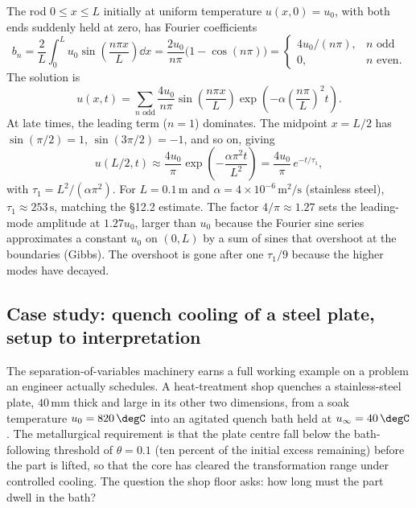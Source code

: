 The rod $0 \leq x \leq L$ initially at uniform temperature
$u(x, 0) = u_{0}$, with both ends suddenly held at zero, has
Fourier coefficients
\[
b_{n} = \frac{2}{L}\int_{0}^{L} u_{0} \sin\!\left(\frac{n \pi x}{L}\right) \dd x = \frac{2 u_{0}}{n \pi}\bigl(1 - \cos(n \pi)\bigr) = \begin{cases} 4 u_{0}/(n \pi), & n \text{ odd} \\ 0, & n \text{ even}. \end{cases}
\]
The solution is
\[
u(x, t) = \sum_{n \text{ odd}} \frac{4 u_{0}}{n \pi} \sin\!\left(\frac{n \pi x}{L}\right) \exp\!\left(-\alpha \left(\frac{n \pi}{L}\right)^{2} t\right).
\]
At late times, the leading term ($n = 1$) dominates. The midpoint
$x = L/2$ has $\sin(\pi/2) = 1$, $\sin(3 \pi/2) = -1$, and so on,
giving
\[
u(L/2, t) \approx \frac{4 u_{0}}{\pi} \exp\!\left(-\frac{\alpha \pi^{2} t}{L^{2}}\right) = \frac{4 u_{0}}{\pi}\, e^{-t/\tau_{1}},
\]
with $\tau_{1} = L^{2}/(\alpha \pi^{2})$. For $L = 0.1\,\si
{\meter}$ and $\alpha = 4 \times 10^{-6}\,\si{\meter\squared\per
\second}$ (stainless steel), $\tau_{1} \approx 253\,\si{\second}$,
matching the §12.2 estimate. The factor $4/\pi \approx 1.27$
sets the leading-mode amplitude at $1.27 u_{0}$, larger than
$u_{0}$ because the Fourier sine series approximates a constant
$u_{0}$ on $(0, L)$ by a sum of sines that overshoot at the
boundaries (Gibbs). The overshoot is gone after one $\tau_{1}/9$
because the higher modes have decayed.

\subsection{Case study: quench cooling of a steel plate, setup to interpretation}

The separation-of-variables machinery earns a full working example
on a problem an engineer actually schedules. A heat-treatment shop
quenches a stainless-steel plate, $40\,\si{\milli\meter}$ thick and
large in its other two dimensions, from a soak temperature $u_{0} =
820\,\degC$ into an agitated quench bath held at $u_{\infty} =
40\,\degC$. The metallurgical requirement is that the plate centre
fall below the bath-following threshold of $\theta = 0.1$ (ten
percent of the initial excess remaining) before the part is lifted,
so that the core has cleared the transformation range under
controlled cooling. The question the shop floor asks: how long must
the part dwell in the bath?

